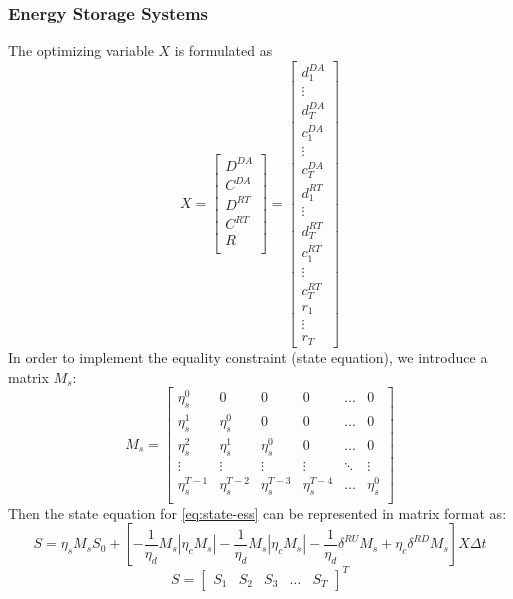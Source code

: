 \subsubsection{Energy Storage Systems}
The optimizing variable $X$ is formulated as 
\[
X = 
\begin{bmatrix}
	D^{DA} \\
	C^{DA} \\
	D^{RT} \\
	C^{RT} \\
	R \\
\end{bmatrix}
=
\begin{bmatrix}
	d_1^{DA} \\
	\vdots \\
	d_T^{DA} \\ 
	c_1^{DA} \\
	\vdots \\
	c_T^{DA} \\ 
	d_1^{RT} \\
	\vdots \\
	d_T^{RT} \\ 
	c_1^{RT} \\
	\vdots \\
	c_T^{RT} \\
	r_1 \\
	\vdots \\
	r_T
\end{bmatrix}
\]
In order to implement the equality constraint (state equation), we introduce a matrix $M_s$:
\[
M_s
=
\begin{bmatrix}
\eta_s^0 & 0 & 0 & 0 & \dots & 0 \\
\eta_s^1 & \eta_s^0 & 0 & 0 & \dots & 0 \\
\eta_s^2 & \eta_s^1 & \eta_s^0 & 0 & \dots & 0 \\
\vdots & \vdots & \vdots & \vdots & \ddots & \vdots \\
\eta_s^{T-1} & \eta_s^{T-2} & \eta_s^{T-3} & \eta_s^{T-4} & \dots & \eta_s^0 \\
\end{bmatrix}
\]
Then the state equation for \eqref{eq:state-ess} can be represented in matrix format as:
\begin{equation*}
S = \eta_s M_s S_0 + [-\frac{1}{\eta_d}M_s | \eta_c M_s | -\frac{1}{\eta_d}M_s | \eta_c M_s | -\frac{1}{\eta_d}  \delta^{RU} M_s + \eta_c \delta^{RD} M_s ] X \Delta t
\end{equation*}
\[
S = 
\begin{bmatrix}
S_1 & S _2 & S_3 & \dots & S_T
\end{bmatrix} ^ {T}
\]

